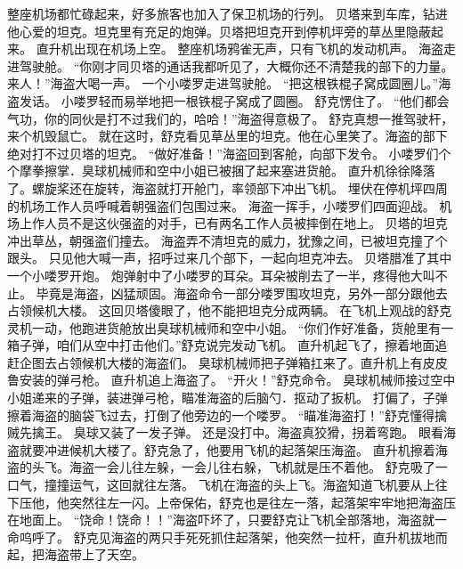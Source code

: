 \documentclass[a4paper,12pt,UTF8,twoside]{ctexbook}
\begin{document}
        整座机场都忙碌起来，好多旅客也加入了保卫机场的行列。 
        贝塔来到车库，钻进他心爱的坦克。坦克里有充足的炮弹。贝塔把坦克开到停机坪旁的草丛里隐蔽起来。 
        直升机出现在机场上空。 
        整座机场鸦雀无声，只有飞机的发动机声。 
        海盗走进驾驶舱。 
        “你刚才同贝塔的通话我都听见了，大概你还不清楚我的部下的力量。来人！”海盗大喝一声。 
        一个小喽罗走进驾驶舱。 
        “把这根铁棍子窝成圆圈儿。”海盗发话。 
        小喽罗轻而易举地把一根铁棍子窝成了圆圈。 
        舒克愣住了。 
        “他们都会气功，你的同伙是打不过我们的，哈哈！”海盗得意极了。 
        舒克真想一推驾驶杆，来个机毁鼠亡。 
        就在这时，舒克看见草丛里的坦克。他在心里笑了。海盗的部下绝对打不过贝塔的坦克。 
        “做好准备！”海盗回到客舱，向部下发令。 
        小喽罗们个个摩拳擦掌．臭球机械师和空中小姐已被捆了起来塞进货舱。 
        直升机徐徐降落了。螺旋桨还在旋转，海盗就打开舱门，率领部下冲出飞机。 
        埋伏在停机坪四周的机场工作人员呼喊着朝强盗们包围过来。 
        海盗一挥手，小喽罗们四面迎战。 
        机场上作人员不是这伙强盗的对手，已有两名工作人员被摔倒在地上。 
        贝塔的坦克冲出草丛，朝强盗们撞去。 
        海盗弄不清坦克的威力，犹豫之间，已被坦克撞了个跟头。 
        只见他大喊一声，招呼过来几个部下，一起向坦克冲去。 
        贝塔腊准了其中一个小喽罗开炮。 
        炮弹射中了小喽罗的耳朵。耳朵被削去了一半，疼得他大叫不止。 
        毕竟是海盗，凶猛顽固。海盗命令一部分喽罗围攻坦克，另外一部分跟他去占领候机大楼。 
        这回贝塔傻眼了，他不能把坦克分成两辆。 
        在飞机上观战的舒克灵机一动，他跑进货舱放出臭球机械师和空中小姐。 
        “你们作好准备，货舱里有一箱子弹，咱们从空中打击他们。”舒克说完发动飞机。 
        直升机起飞了，擦着地面追赶企图去占领候机大楼的海盗们。 
        臭球机械师把子弹箱扛来了。直升机上有皮皮鲁安装的弹弓枪。 
        直升机追上海盗了。 
        “开火！”舒克命令。 
        臭球机械师接过空中小姐递来的子弹，装进弹弓枪，瞄准海盗的后脑勺．抠动了扳机。 
        打偏了，子弹擦着海盗的脑袋飞过去，打倒了他旁边的一个喽罗。 
        “瞄准海盗打！”舒克懂得擒贼先擒王。 
        臭球又装了一发子弹。 
        还是没打中。海盗真狡猾，拐着弯跑。 
        眼看海盗就要冲进候机大楼了。舒克急了，他要用飞机的起落架压海盗。 
        直升机擦着海盗的头飞。海盗一会儿往左躲，一会儿往右躲，飞机就是压不着他。 
        舒克吸了一口气，撞撞运气，这回就往左落。 
        飞机在海盗的头上飞。海盗知道飞机要从上往下压他，他突然往左一闪。上帝保佑，舒克也是往左一落，起落架牢牢地把海盗压在地面上。 
        “饶命！饶命！！”海盗吓坏了，只要舒克让飞机全部落地，海盗就一命呜呼了。 
        舒克见海盗的两只手死死抓住起落架，他突然一拉杆，直升机拔地而起，把海盗带上了天空。 
\end{document}
